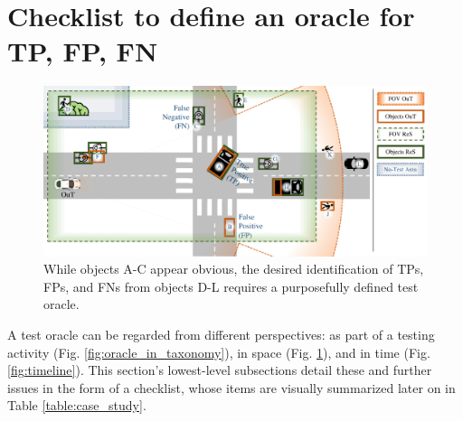 \documentclass[conference]{IEEEtran}
\begin{document}






\section{Checklist to define an oracle for TP, FP, FN}
\label{sec:criteria}



\begin{figure}[t]
	\centering
	\vspace*{2mm}
	\includegraphics[width=\textwidth]{img/top_down_fitting_slide.pdf}
	
	\caption{ While objects A-C appear obvious, the desired identification of TPs, FPs, and FNs from objects D-L requires a purposefully defined test oracle. 
	}
	\label{fig:top_down_all}
\end{figure}


A test oracle can be regarded from different perspectives: as part of a testing activity (Fig. \ref{fig:oracle_in_taxonomy}), in space (Fig. \ref{fig:top_down_all}), and in time (Fig. \ref{fig:timeline}).
This section's lowest-level subsections detail these and further issues in the form of a checklist, whose items are visually summarized later on in Table \ref{table:case_study}. 
\end{document}
